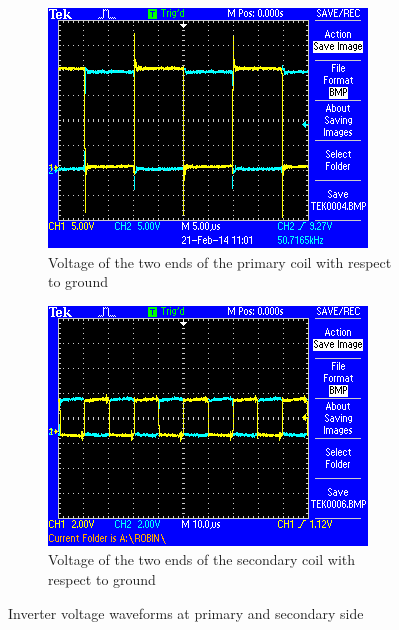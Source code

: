 \documentclass[11pt,titlepage]{report}
\begin{document}
\begin{figure}[H]
	\begin{center}
		\begin{subfigure}[h]{0.48\textwidth}
			\includegraphics[width=\textwidth]{resource/osc-coil-primary.png}
			\caption{Voltage of the two ends of the primary coil with respect to ground}
			\label{fig:charging-osc-coil-primary}
		\end{subfigure}
		\quad
		\begin{subfigure}[h]{0.48\textwidth}
			\includegraphics[width=\textwidth]{resource/osc-coil-secondary.png}
			\caption{Voltage of the two ends of the secondary coil with respect to ground}
			\label{fig:charging-osc-coil-secondary}
		\end{subfigure}
	\end{center}
	\caption{Inverter voltage waveforms at primary and secondary side}
\end{figure}
\end{document}

